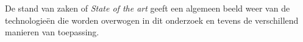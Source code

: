\chapter{}
\label{ch:stand-van-zaken}






De stand van zaken of \textit{State of the art} geeft een algemeen beeld weer van de technologieën die worden overwogen in dit onderzoek en tevens de verschillend manieren van toepassing.

